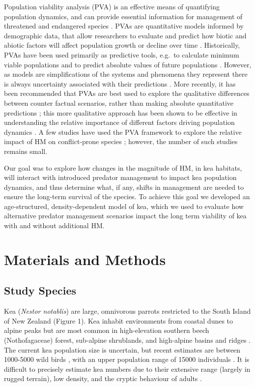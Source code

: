 \documentclass[11pt,]{article}
\begin{document}
Population viability analysis (PVA) is an effective means of quantifying
population dynamics, and can provide essential information for
management of threatened and endangered species
\citep{boyce1992, morris2002}. PVAs are quantitative models informed by
demographic data, that allow researchers to evaluate and predict how
biotic and abiotic factors will affect population growth or decline over
time \citep{beissinger1998, Mills2002}. Historically, PVAs have been
used primarily as predictive tools, e.g.~to calculate minimum viable
populations and to predict absolute values of future populations
\citep{boyce1992, ginzburg1982}. However, as models are simplifications
of the systems and phenomena they represent there is always uncertainty
associated with their predictions \citep{coulson2001, ellner2002}. More
recently, it has been recommended that PVAs are best used to explore the
qualitative differences between counter factual scenarios, rather than
making absolute quantitative predictions \citep{simpkins2018}; this more
qualitative approach has been shown to be effective in understanding the
relative importance of different factors driving population dynamics
\citep[e.g.~][]{simpkins2015}. A few studies have used the PVA framework
to explore the relative impact of HM on conflict-prone species
\citep[e.g][]{lafever2008, goswami2014}; however, the number of such
studies remains small.

Our goal was to explore how changes in the magnitude of HM, in kea
habitats, will interact with introduced predator management to impact
kea population dynamics, and thus determine what, if any, shifts in
management are needed to ensure the long-term survival of the species.
To achieve this goal we developed an age-structured, density-dependent
model of kea, which we used to evaluate how alternative predator
management scenarios impact the long term viability of kea with and
without additional HM.

\hypertarget{materials-and-methods}{%
\section{Materials and Methods}\label{materials-and-methods}}

\hypertarget{study-species}{%
\subsection{Study Species}\label{study-species}}

Kea (\emph{Nestor notablis}) are large, omnivorous parrots restricted to
the South Island of New Zealand (Figure 1). Kea inhabit environments
from coastal dunes to alpine peaks but are most common in high-elevation
southern beech (Nothofagaceae) forest, sub-alpine shrublands, and
high-alpine basins and ridges \citep{higgins1999, robertson2007}. The
current kea population size is uncertain, but recent estimates are
between 1000-5000 wild birds \citep{anderson1986, pullar1996}, with an
upper population range of 15000 individuals \citep{bond1992}. It is
difficult to precisely estimate kea numbers due to their extensive range
(largely in rugged terrain), low density, and the cryptic behaviour of
adults \citep{orrWalker2009}.
\end{document}

